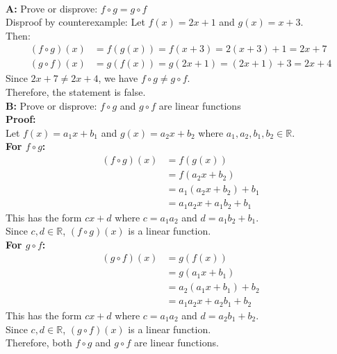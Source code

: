 \documentclass[10pt]{exam}
\begin{document}
\begin{questions}
\begin{solution}\\
    \textbf{A:} Prove or disprove: $f \circ g = g \circ f$\\
    Disproof by counterexample:
    Let $f(x) = 2x + 1$ and $g(x) = x + 3$.\\
    Then:
    \begin{align*}
    (f \circ g)(x) &= f(g(x)) = f(x + 3) = 2(x + 3) + 1 = 2x + 7\\
    (g \circ f)(x) &= g(f(x)) = g(2x + 1) = (2x + 1) + 3 = 2x + 4
    \end{align*}
    Since $2x + 7 \neq 2x + 4$, we have $f \circ g \neq g \circ f$.\\
    Therefore, the statement is false.\\
    
    \textbf{B:} Prove or disprove: $f \circ g$ and $g \circ f$ are linear functions\\
    \textbf{Proof:}\\
    Let $f(x) = a_1x + b_1$ and $g(x) = a_2x + b_2$ where $a_1, a_2, b_1, b_2 \in \mathbb{R}$.\\
    \textbf{For $f \circ g$:}
    \begin{align*}
    (f \circ g)(x) &= f(g(x))\\
    &= f(a_2x + b_2)\\
    &= a_1(a_2x + b_2) + b_1\\
    &= a_1a_2x + a_1b_2 + b_1
    \end{align*}
    This has the form $cx + d$ where $c = a_1a_2$ and $d = a_1b_2 + b_1$.\\
    Since $c, d \in \mathbb{R}$, $(f \circ g)(x)$ is a linear function.\\
    \textbf{For $g \circ f$:}
    \begin{align*}
    (g \circ f)(x) &= g(f(x))\\
    &= g(a_1x + b_1)\\
    &= a_2(a_1x + b_1) + b_2\\
    &= a_1a_2x + a_2b_1 + b_2
    \end{align*}
    This has the form $cx + d$ where $c = a_1a_2$ and $d = a_2b_1 + b_2$.\\
    Since $c, d \in \mathbb{R}$, $(g \circ f)(x)$ is a linear function.\\
    Therefore, both $f \circ g$ and $g \circ f$ are linear functions.
\end{solution}

\end{questions}
\end{document}
